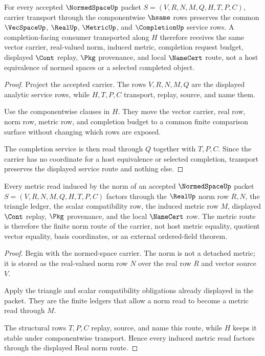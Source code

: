 \begin{theorem}
\label{thm:normedspace-carrier-transport-completion-service}
For every accepted $\NormedSpaceUp$ packet $S=(V,R,N,M,Q,H,T,P,C)$,
carrier transport through the componentwise $\hsame$ rows preserves the common
$\VecSpaceUp$, $\RealUp$, $\MetricUp$, and $\CompletionUp$ service rows. A
completion-facing consumer transported along $H$ therefore receives the same
vector carrier, real-valued norm, induced metric, completion request budget,
displayed $\Cont$ replay, $\Pkg$ provenance, and local $\NameCert$ route, not a
host equivalence of normed spaces or a selected completed object.
\end{theorem}
\begin{proof}
Project the accepted carrier. The rows $V,R,N,M,Q$ are the displayed analytic
service rows, while $H,T,P,C$ transport, replay, source, and name them.

Use the componentwise clauses in $H$. They move the vector carrier, real row,
norm row, metric row, and completion budget to a common finite comparison
surface without changing which rows are exposed.

The completion service is then read through $Q$ together with $T,P,C$. Since
the carrier has no coordinate for a host equivalence or selected completion,
transport preserves the displayed service route and nothing else.
\end{proof}

\begin{theorem}
\label{thm:normedspace-real-norm-metric-route}
Every metric read induced by the norm of an accepted $\NormedSpaceUp$ packet
$S=(V,R,N,M,Q,H,T,P,C)$ factors through the $\RealUp$ norm row $R,N$, the
triangle ledger, the scalar compatibility row, the induced metric row $M$,
displayed $\Cont$ replay, $\Pkg$ provenance, and the local $\NameCert$ row.
The metric route is therefore the finite norm route of the carrier, not host
metric equality, quotient vector equality, basis coordinates, or an external
ordered-field theorem.
\end{theorem}
\begin{proof}
Begin with the normed-space carrier. The norm is not a detached metric; it is
stored as the real-valued norm row $N$ over the real row $R$ and vector source
$V$.

Apply the triangle and scalar compatibility obligations already displayed in
the packet. They are the finite ledgers that allow a norm read to become a
metric read through $M$.

The structural rows $T,P,C$ replay, source, and name this route, while $H$
keeps it stable under componentwise transport. Hence every induced metric read
factors through the displayed Real norm route.
\end{proof}

